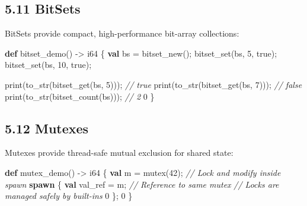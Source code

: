 \documentclass[
  english,
]{book}
\newenvironment{Shaded}{\begin{snugshade}}{\end{snugshade}}
\newcommand{\CommentTok}[1]{\textcolor[rgb]{0.42,0.60,0.33}{\textit{#1}}}
\newcommand{\ConstantTok}[1]{\textcolor[rgb]{0.31,0.76,1.00}{#1}}
\newcommand{\DataTypeTok}[1]{\textcolor[rgb]{0.31,0.79,0.69}{#1}}
\newcommand{\DecValTok}[1]{\textcolor[rgb]{0.71,0.81,0.66}{#1}}
\newcommand{\FunctionTok}[1]{\textcolor[rgb]{0.86,0.86,0.67}{#1}}
\newcommand{\KeywordTok}[1]{\textcolor[rgb]{0.34,0.61,0.84}{\textbf{#1}}}
\newcommand{\NormalTok}[1]{\textcolor[rgb]{0.83,0.83,0.83}{#1}}
\newcommand{\OperatorTok}[1]{\textcolor[rgb]{0.83,0.83,0.83}{#1}}
\begin{document}
\subsection{5.11 BitSets}\label{bitsets-1}

BitSets provide compact, high-performance bit-array collections:

\begin{Shaded}
\begin{Highlighting}[]
\KeywordTok{def}\NormalTok{ bitset\_demo() }\OperatorTok{{-}\textgreater{}} \DataTypeTok{i64}\NormalTok{ \{}
    \KeywordTok{val}\NormalTok{ bs }\OperatorTok{=} \FunctionTok{bitset\_new}\NormalTok{();}
    \FunctionTok{bitset\_set}\NormalTok{(bs, }\DecValTok{5}\NormalTok{, }\ConstantTok{true}\NormalTok{);}
    \FunctionTok{bitset\_set}\NormalTok{(bs, }\DecValTok{10}\NormalTok{, }\ConstantTok{true}\NormalTok{);}
    
    \FunctionTok{print}\NormalTok{(}\FunctionTok{to\_str}\NormalTok{(}\FunctionTok{bitset\_get}\NormalTok{(bs, }\DecValTok{5}\NormalTok{)));   }\CommentTok{// true}
    \FunctionTok{print}\NormalTok{(}\FunctionTok{to\_str}\NormalTok{(}\FunctionTok{bitset\_get}\NormalTok{(bs, }\DecValTok{7}\NormalTok{)));   }\CommentTok{// false}
    \FunctionTok{print}\NormalTok{(}\FunctionTok{to\_str}\NormalTok{(}\FunctionTok{bitset\_count}\NormalTok{(bs)));    }\CommentTok{// 2}
    \DecValTok{0}
\NormalTok{\}}
\end{Highlighting}
\end{Shaded}

\subsection{5.12 Mutexes}\label{mutexes-1}

Mutexes provide thread-safe mutual exclusion for shared state:

\begin{Shaded}
\begin{Highlighting}[]
\KeywordTok{def}\NormalTok{ mutex\_demo() }\OperatorTok{{-}\textgreater{}} \DataTypeTok{i64}\NormalTok{ \{}
    \KeywordTok{val}\NormalTok{ m }\OperatorTok{=} \DataTypeTok{mutex}\NormalTok{(}\DecValTok{42}\NormalTok{);}
    \CommentTok{// Lock and modify inside spawn}
    \KeywordTok{spawn}\NormalTok{ \{}
        \KeywordTok{val}\NormalTok{ val\_ref }\OperatorTok{=}\NormalTok{ m; }\CommentTok{// Reference to same mutex}
        \CommentTok{// Locks are managed safely by built{-}ins}
        \DecValTok{0}
\NormalTok{    \};}
    \DecValTok{0}
\NormalTok{\}}
\end{Highlighting}
\end{Shaded}
\end{document}
